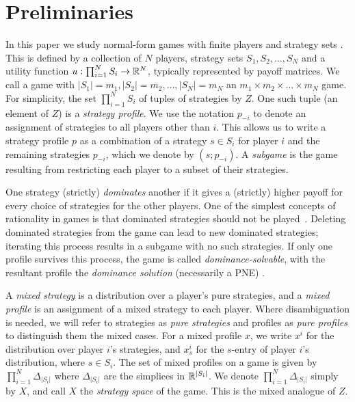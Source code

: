 \documentclass[preprint,authoryear]{elsarticle}
\begin{document}
\section{Preliminaries} \label{sec: preliminaries}
In this paper we study normal-form games with finite players and strategy sets \citep{myerson1997game}. This is defined by a collection of $N$ players, strategy sets $S_1,S_2,\dots,S_N$ and a utility function $u : \prod_{i=1}^{N}S_i \to \mathbb{R}^N$, typically represented by payoff matrices. We call a game with $|S_1|= m_1, |S_2| = m_2, \dots, |S_N| = m_N$ an $m_1\times m_2 \times \dots \times m_N$ game. For simplicity, the set $\prod_{i=1}^{N}S_i$ of tuples of strategies by $Z$. One such tuple (an element of $Z$) is a \emph{strategy profile}. We use the notation $p_{-i}$ to denote an assignment of strategies to all players other than $i$. %
This allows us to write a strategy profile $p$ as a combination of a strategy $s\in S_i$ for player $i$ and the remaining strategies $p_{-i}$, which we denote by $(s ; p_{-i})$. A \emph{subgame} is the game resulting from restricting each player to a subset of their strategies.

One strategy (strictly) \emph{dominates} another if it gives a (strictly) higher payoff for every choice of strategies for the other players. One of the simplest concepts of rationality in games is that dominated strategies should not be played~\citep{myerson1997game}. Deleting dominated strategies from the game can lead to new dominated strategies; iterating this process results in a subgame with no such strategies. If only one profile survives this process, the game is called \emph{dominance-solvable}, with the resultant profile the \emph{dominance solution} (necessarily a PNE) \citep{myerson1997game,moulin_dominance_1984}.

A \emph{mixed strategy} is a distribution over a player's pure strategies, and a \emph{mixed profile} is an assignment of a mixed strategy to each player. Where disambiguation is needed, we will refer to strategies as \emph{pure strategies} and profiles as \emph{pure profiles} to distinguish them the mixed cases. For a mixed profile $x$, we write $x^i$ for the distribution over player $i$'s strategies, and $x^i_s$ for the $s$-entry of player $i$'s distribution, where $s\in S_i$. The set of mixed profiles on a game is given by $\prod_{i=1}^N \Delta_{|S_i|}$ where $\Delta_{|S_i|}$ are the simplices in $\mathbb{R}^{|S_i|}$. We denote $\prod_{i=1}^N \Delta_{|S_i|}$ simply by $X$, and call $X$ the \emph{strategy space} of the game. This is the mixed analogue of $Z$. 
\end{document}
